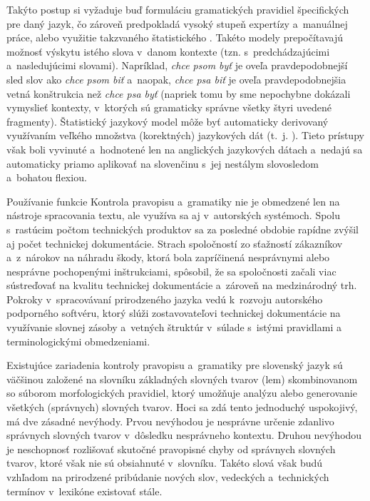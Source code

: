 \begin{multicols}{2}
Takýto postup si vyžaduje buď formuláciu gramatických
pravidiel špecifických pre daný jazyk, čo zároveň predpokladá
vysoký stupeň expertízy a~manuálnej práce, alebo využitie
takzvaného štatistického . Takéto
modely prepočítavajú možnosť výskytu istého slova v~danom kontexte
(tzn. s~predchádzajúcimi a~nasledujúcimi slovami). Napríklad,
\emph{chce psom byť} je oveľa pravdepodobnejší sled slov ako
\emph{chce psom biť} a~naopak, \emph{chce psa biť} je oveľa
pravdepodobnejšia vetná konštrukcia než \emph{chce psa byť}
(napriek tomu by sme nepochybne dokázali vymyslieť kontexty,
v~ktorých sú gramaticky správne všetky štyri uvedené fragmenty).
Štatistický jazykový model môže byť automaticky derivovaný
využívaním veľkého množstva (korektných) jazykových dát (t.~j.
). Tieto prístupy však boli vyvinuté a~hodnotené
len na anglických jazykových dátach a~nedajú sa automaticky priamo
aplikovať na slovenčinu s~jej nestálym slovosledom a~bohatou flexiou.

Používanie funkcie Kontrola pravopisu a~gramatiky nie je obmedzené
len na nástroje spracovania textu, ale využíva sa aj
v~autorských systémoch. Spolu s~rastúcim počtom technických
produktov sa za posledné obdobie rapídne zvýšil aj počet technickej
dokumentácie. Strach spoločností zo sťažností zákazníkov
a~z~nárokov na náhradu škody, ktorá bola zapríčinená nesprávnymi
alebo nesprávne pochopenými inštrukciami, spôsobil, že sa
spoločnosti začali viac sústreďovať na kvalitu technickej
dokumentácie a~zároveň na medzinárodný trh. Pokroky
v~spracovávaní prirodzeného jazyka vedú k~rozvoju autorského
podporného softvéru, ktorý slúži zostavovateľovi technickej
dokumentácie na využívanie slovnej zásoby a~vetných štruktúr
v~súlade s~istými pravidlami a terminologickými
obmedzeniami.



Existujúce zariadenia kontroly pravopisu a~gramatiky pre slovenský
jazyk sú väčšinou založené na slovníku základných slovných
tvarov (lem) skombinovanom so súborom morfologických pravidiel, ktorý
umožňuje analýzu alebo generovanie všetkých (správnych) slovných
tvarov. Hoci sa zdá tento jednoduchý uspokojivý, má dve
zásadné nevýhody. Prvou nevýhodou je nesprávne určenie zdanlivo
správnych slovných tvarov v~dôsledku nesprávneho kontextu. Druhou
nevýhodou je neschopnosť rozlišovať skutočné pravopisné chyby od
správnych slovných tvarov, ktoré však nie sú obsiahnuté
v~slovníku. Takéto slová však budú vzhľadom na prirodzené
pribúdanie nových slov, vedeckých a~technických termínov
v~lexikóne existovať stále.


\end{multicols}
